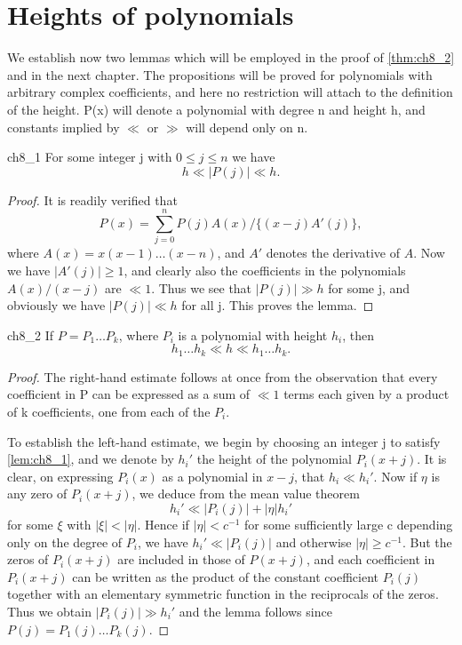 \section{Heights of polynomials}\label{sec:ch8_4}

We establish now two lemmas which will be employed in the proof of \autoref{thm:ch8_2} and in the next chapter. The propositions will be proved for polynomials with arbitrary complex coefficients, and here no restriction will attach to the definition of the height. P(x) will denote a polynomial with degree n and height h, and constants implied by $\ll$ or $\gg$ will depend only on n.

\begin{mylemma}{}{ch8_1}
For some integer j with $0 \le j \le n$ we have
\[h \ll |P(j)| \ll h.\]
\end{mylemma}

\begin{proof}
It is readily verified that
\[P(x) = \sum_{j=0}^{n} P(j) A(x)/\{(x-j) A'(j)\},\]
where $A(x) = x(x-1)\dots(x-n)$, and $A'$ denotes the derivative of $A$. Now we have $|A'(j)| \ge 1$, and clearly also the coefficients in the polynomials $A(x)/(x-j)$ are $\ll 1$. Thus we see that $|P(j)| \gg h$ for some j, and obviously we have $|P(j)| \ll h$ for all j. This proves the lemma.
\end{proof}

\begin{mylemma}{}{ch8_2}
If $P = P_1 \dots P_k$, where $P_i$ is a polynomial with height $h_i$, then
\[h_1 \dots h_k \ll h \ll h_1 \dots h_k.\]
\end{mylemma}

\begin{proof}
The right-hand estimate follows at once from the observation that every coefficient in P can be expressed as a sum of $\ll 1$ terms each given by a product of k coefficients, one from each of the $P_i$.

To establish the left-hand estimate, we begin by choosing an integer j to satisfy \autoref{lem:ch8_1}, and we denote by $h_i'$ the height of the polynomial $P_i(x+j)$. It is clear, on expressing $P_i(x)$ as a polynomial in $x-j$, that $h_i \ll h_i'$. Now if $\eta$ is any zero of $P_i(x+j)$, we deduce from the mean value theorem
\[h_i' \ll |P_i(j)| + |\eta| h_i'\]
for some $\xi$ with $|\xi| < |\eta|$. Hence if $|\eta| < c^{-1}$ for some sufficiently large c depending only on the degree of $P_i$, we have $h_i' \ll |P_i(j)|$ and otherwise $|\eta| \ge c^{-1}$. But the zeros of $P_i(x+j)$ are included in those of $P(x+j)$, and each coefficient in $P_i(x+j)$ can be written as the product of the constant coefficient $P_i(j)$ together with an elementary symmetric function in the reciprocals of the zeros. Thus we obtain $|P_i(j)| \gg h_i'$ and the lemma follows since $P(j) = P_1(j) \dots P_k(j)$.
\end{proof}

